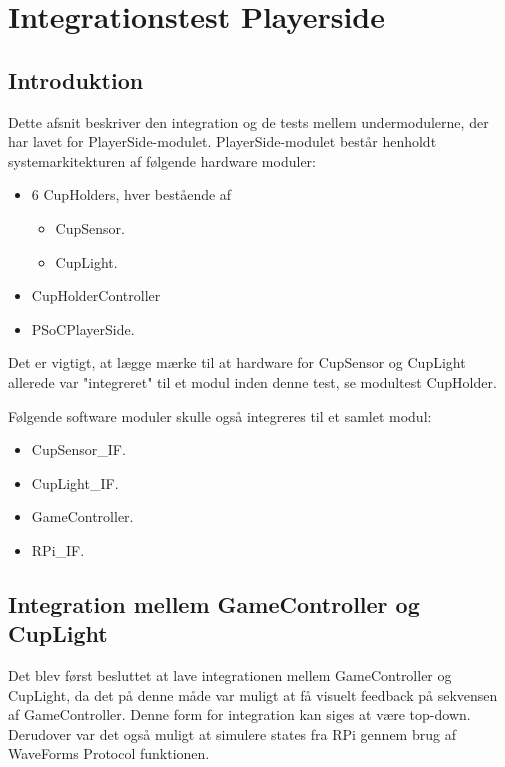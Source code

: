 \documentclass[Integrationstest/Integrationstest_main.tex]{subfiles}
\begin{document}
\section{Integrationstest Playerside}
\subsection{Introduktion}
Dette afsnit beskriver den integration og de tests mellem undermodulerne, der har lavet for PlayerSide-modulet. PlayerSide-modulet består henholdt systemarkitekturen af følgende hardware moduler: 
\begin{itemize}
    \item 6 CupHolders, hver bestående af 
    \begin{itemize}
        \item CupSensor.
        \item CupLight.
    \end{itemize}
    \item CupHolderController
    \item PSoCPlayerSide.
\end{itemize}
Det er vigtigt, at lægge mærke til at hardware for CupSensor og CupLight allerede var "integreret" til et modul inden denne test, se modultest CupHolder. 

Følgende software moduler skulle også integreres til et samlet modul:
\begin{itemize}
    \item CupSensor\_IF.
    \item CupLight\_IF.
    \item GameController.
    \item RPi\_IF.
\end{itemize}


\subsection{Integration mellem GameController og CupLight}
Det blev først besluttet at lave integrationen mellem GameController og CupLight, da det på denne måde var muligt at få visuelt feedback på sekvensen af GameController. Denne form for integration kan siges at være top-down.  Derudover var det også muligt at simulere states fra RPi gennem brug af WaveForms Protocol funktionen. 
\end{document}
